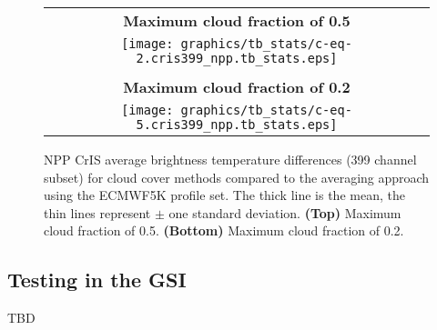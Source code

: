 \begin{figure}[H]
  \caption{NPP CrIS average brightness temperature differences (399 channel subset) for cloud cover methods compared to the averaging approach using the ECMWF5K profile set. The thick line is the mean, the thin lines represent $\pm$ one standard deviation. \textbf{(Top)} Maximum cloud fraction of 0.5. \textbf{(Bottom)} Maximum cloud fraction of 0.2. }
  \label{fig:cris399_npp.tb_stats}
  \centering
  \begin{tabular}{c}
    \\
    \sffamily\textbf{Maximum cloud fraction of 0.5} \\
    \texttt{[image: graphics/tb\_stats/c-eq-2.cris399\_npp.tb\_stats.eps]} \\\\
    \sffamily\textbf{Maximum cloud fraction of 0.2} \\
    \texttt{[image: graphics/tb\_stats/c-eq-5.cris399\_npp.tb\_stats.eps]}
  \end{tabular}
\end{figure}


\subsection{Testing in the GSI}

TBD


